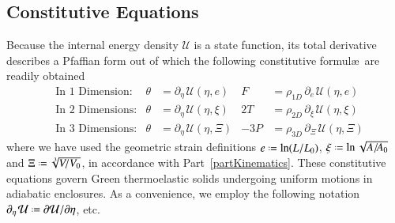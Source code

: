 \subsection{Constitutive Equations}

Because the internal energy density $\mathcal{U}$ is a state function, its total derivative describes a Pfaffian form \cite{Caratheodory09} out of which the following constitutive formul\ae\ are readily obtained
\begin{subequations}
    \label{GreenElasticCEs}
    \begin{align}
    \mbox{} & \text{In 1 Dimension:} & 
    \theta & = \partial_{\eta\,} \mathcal{U} ( \eta , e) &
    F & = \rho_{1D} \, \partial_{e\,} \mathcal{U} ( \eta , e) \\
    \mbox{} & \text{In 2 Dimensions:} &
    \theta & = \partial_{\eta\,} \mathcal{U} ( \eta , \xi) &
    2T & = \rho_{2D} \, \partial_{\xi\,} \mathcal{U} ( \eta , \xi) \\
    \mbox{} & \text{In 3 Dimensions:} &
    \theta & = \partial_{\eta\,} \mathcal{U} ( \eta ,  \Xi) &
    -3P & = \rho_{3D} \, \partial_{\Xi\,} \mathcal{U} ( \eta ,  \Xi)
    \end{align}
\end{subequations}
where we have used the geometric strain definitions $e \defeq \ln ( L / L_0 )$, $\xi \defeq \ln \sqrt{ A / \! A_0 }$ and $\Xi \defeq \sqrt[3]{V \! / V_0}$, in accordance with Part~\ref{partKinematics}. These constitutive equations govern Green thermo\-elastic solids undergoing uniform motions in adiabatic enclosures.  As a convenience, we employ the following notation $\partial_{\eta\,} \mathcal{U} \defeq \partial \mathcal{U} / \partial \eta$, etc.

